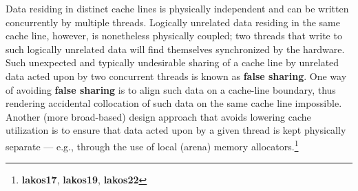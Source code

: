 Data residing in distinct cache lines is physically independent and can
be written concurrently by multiple threads. Logically unrelated data
residing in the same cache line, however, is nonetheless physically
coupled; two threads that write to such logically unrelated data will find
themselves synchronized by the hardware. Such unexpected and typically
undesirable sharing of a cache line by unrelated data acted upon by two
concurrent threads is known as \textbf{false sharing}. One way of
avoiding \textbf{false sharing} is to align such data on a cache-line
boundary, thus rendering accidental collocation of such data on the same
cache line impossible. Another (more broad-based) design approach that
avoids lowering cache utilization is to ensure that data acted upon by a
given thread is kept physically separate --- e.g., through the use of
local (arena) memory allocators.{\cprotect\footnote{\textbf{{lakos17}},
  \textbf{{lakos19}}, \textbf{{lakos22}}}}

